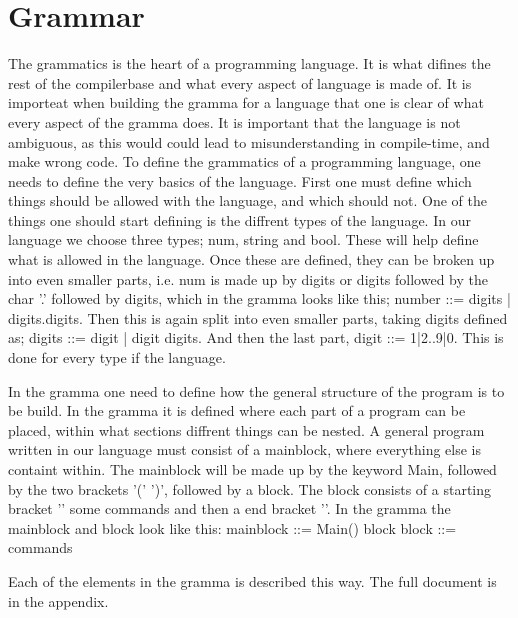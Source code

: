 \section{Grammar}
The grammatics is the heart of a programming language. It is what difines the rest of the compilerbase and what every aspect of language is made of.
It is importeat when building the gramma for a language that one is clear of what every aspect of the gramma does. It is important that the language is not ambiguous, as this would could lead to misunderstanding in compile-time, and make wrong code.
To define the grammatics of a programming language, one needs to define the very basics of the language. First one must define which things should be allowed with the language, and which should not.
One of the things one should start defining is the diffrent types of the language. In our language we choose three types; num, string and bool. These will help define what is allowed in the language. Once these are defined, they can be broken up into even smaller parts, i.e. num is made up by digits or digits followed by the char '.' followed by digits, which in the gramma looks like this; number ::= digits | digits.digits.
Then this is again split into even smaller parts, taking digits defined as; digits ::= digit | digit digits. And then the last part, digit ::= 1|2..9|0. This is done for every type if the language.

In the gramma one need to define how the general structure of the program is to be build. In the gramma it is defined where each part of a program can be placed, within what sections diffrent things can be nested. A general program written in our language must consist of a mainblock, where everything else is containt within. The mainblock will be made up by the keyword Main, followed by the two brackets '(' ')', followed by a block.
The block consists of a starting bracket '{' some commands and then a end bracket '}'. In the gramma the mainblock and block look like this: mainblock ::= Main() block
block ::= { commands }

Each of the elements in the gramma is described this way. The full document is in the appendix.